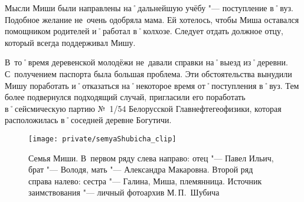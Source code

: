 Мысли Миши были направлены на˚дальнейшую учёбу "--- поступление в˚вуз. Подобное желание не~очень одобряла мама. Ей хотелось, чтобы Миша оставался помощником родителей и˚работал в˚колхозе. Следует отдать должное отцу, который всегда поддерживал Мишу. 

В~то˚время деревенской молодёжи не~давали справки на˚выезд из˚деревни. С~получением паспорта была большая проблема. Эти обстоятельства вынудили Мишу поработать и˚отказаться на˚некоторое время от˚поступления в˚вуз. Тем более подвернулся подходящий случай, пригласили его поработать в˚сейсмическую партию №~1/54 Белорусской Главнефтегеофизики, которая расположилась в˚соседней деревне Богутичи.
\clearpage			%

\begin{figure}[h]
\texttt{[image: private/semyaShubicha\_clip]}
\caption{Семья Миши. В~первом ряду слева направо: отец "--- Павел Ильич, брат "--- Володя, мать "--- Александра Макаровна. Второй ряд справа налево: сестра "--- Галина, Миша, племянница. Источник заимствования "--- личный фотоархив М.\,П.~Шубича}
\label{fig:semyaShubicha}
\end{figure}


